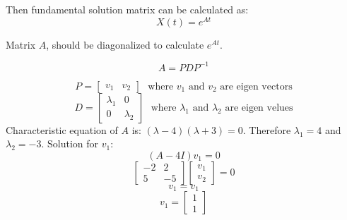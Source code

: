 \documentclass[12pt,a4paper, margin=1in]{article}
\begin{document}
\begin{enumerate}
\begin{enumerate}
            Then fundamental solution matrix can be calculated as:
            \begin{equation*}
                X(t) = e^{At}
            \end{equation*}

            Matrix $A$, should be diagonalized to calculate $e^{At}$.
            
            \begin{equation*}
                A = PDP^{-1}
            \end{equation*}

            \begin{equation*}
                P = \begin{bmatrix}v_1 & v_2 \end{bmatrix}\ \ \ \text{where $v_1$ and $v_2$ are eigen vectors}
            \end{equation*}
            \begin{equation*}
                D = \begin{bmatrix}
                    \lambda_1 & 0\\
                    0 & \lambda_2 
                    \end{bmatrix} \ \ \ \text{where $\lambda_1$ and $\lambda_2$ are eigen velues}
            \end{equation*}
            \newline
            Characteristic equation of $A$ is: $(\lambda-4)(\lambda + 3) = 0$. Therefore $\lambda_1 = 4$ and $\lambda_2 = -3$.
            \clearpage
            Solution for $v_1$:
            \begin{equation*}
                (A - 4I)v_1 = 0
            \end{equation*}
            \begin{equation*}
                \begin{bmatrix}
                    -2 & 2 \\
                    5 & -5
                \end{bmatrix}\begin{bmatrix}
                    v_1 \\ v_2
                \end{bmatrix} = 0
            \end{equation*}
            \begin{equation*}
                v_1 = v_1
            \end{equation*}
            \begin{equation*}
                v_1 = \begin{bmatrix}
                    1 \\ 1
                \end{bmatrix}
            \end{equation*}


\end{enumerate}
\end{enumerate}
\end{document}
